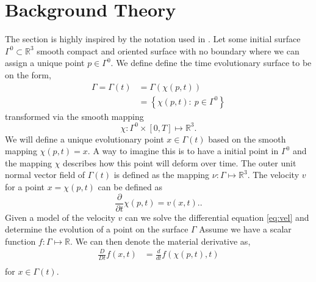 

\section{Background Theory}%
\label{sec:differential_geometry}

The section is highly inspired by the notation used in \cite{kovacs2021convergent}.
Let some initial surface $\Gamma^{0} \subset \mathbb{R} ^3  $ smooth compact and oriented surface with no boundary where we can assign a unique point $p \in \Gamma ^{0}$. We define define the time evolutionary surface to be on the form,
\[
    \begin{split}
\Gamma  = \Gamma \left( t \right) & = \Gamma \left( \chi \left( p,t \right)  \right) \\
                                  &= \left\{ \chi \left( p,t \right): \ p \in \Gamma^{0}  \right\}
    \end{split}
\]
transformed via the smooth mapping
\[
\chi : \Gamma^{0} \times  \left[ 0,T \right]  \mapsto  \mathbb{R} ^3.
\]
We will define a unique evolutionary point $x \in \Gamma \left( t \right) $ based on the smooth mapping $\chi \left( p,t \right) = x$. A way to imagine this is to have a initial point in $\Gamma ^{0}$ and the mapping $\chi $ describes how this point will deform over time. The outer unit normal vector field of $\Gamma \left( t \right) $ is defined as the mapping $\nu : \Gamma \mapsto
\mathbb{R} ^{3}$. The velocity $v$ for a point $x = \chi \left( p,t \right) $ can be defined as
\begin{equation}
    \label{eq:vel}
\frac{\partial }{\partial  t}  \chi \left( p,t \right)  = v\left( x,t \right).
.\end{equation}
Given a model of the velocity $v$ can we solve the differential equation \eqref{eq:vel} and determine the evolution of a point on the surface $\Gamma $
Assume we have a scalar function $f: \Gamma \mapsto \mathbb{R}  $. We can then denote the material derivative as,
\[
    \begin{split}
\frac{D}{Dt}  f\left( x,t \right)  & = \frac{d}{dt} f \left( \chi \left( p,t \right) , t \right) \\
    \end{split}
\]
for $x \in \Gamma \left( t \right)  $.


